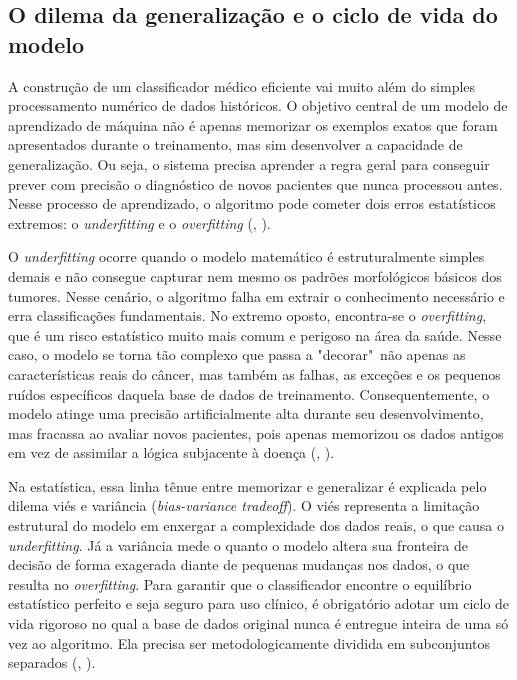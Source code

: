 \documentclass[
    12pt
    ,oneside
    ,a4paper
    ,chapter=TITLE
    ,section=TITLE
    ,sumario=abnt-6027-2012
    ,english,brazil]{abntex2} %
\begin{document}
\subsection{O dilema da generalização e o ciclo de vida do modelo}

A construção de um classificador médico eficiente vai muito além do simples processamento numérico de dados históricos. O objetivo central de um modelo de aprendizado de máquina não é apenas memorizar os exemplos exatos que foram apresentados durante o treinamento, mas sim desenvolver a capacidade de generalização. Ou seja, o sistema precisa aprender a regra geral para conseguir prever com precisão o diagnóstico de novos pacientes que nunca processou antes. Nesse processo de aprendizado, o algoritmo pode cometer dois erros estatísticos extremos: o \textit{underfitting} e o \textit{overfitting} (, \citeyear{Faceli2011}).

O \textit{underfitting} ocorre quando o modelo matemático é estruturalmente simples demais e não consegue capturar nem mesmo os padrões morfológicos básicos dos tumores. Nesse cenário, o algoritmo falha em extrair o conhecimento necessário e erra classificações fundamentais. No extremo oposto, encontra-se o \textit{overfitting}, que é um risco estatístico muito mais comum e perigoso na área da saúde. Nesse caso, o modelo se torna tão complexo que passa a "decorar"\ não apenas as características reais do câncer, mas também as falhas, as exceções e os pequenos ruídos específicos daquela base de dados de treinamento. Consequentemente, o modelo atinge uma precisão artificialmente alta durante seu desenvolvimento, mas fracassa ao avaliar novos pacientes, pois apenas memorizou os dados antigos em vez de assimilar a lógica subjacente à doença (, \citeyear{Faceli2011}).

Na estatística, essa linha tênue entre memorizar e generalizar é explicada pelo dilema viés e variância (\textit{bias-variance tradeoff}). O viés representa a limitação estrutural do modelo em enxergar a complexidade dos dados reais, o que causa o \textit{underfitting}. Já a variância mede o quanto o modelo altera sua fronteira de decisão de forma exagerada diante de pequenas mudanças nos dados, o que resulta no \textit{overfitting}. Para garantir que o classificador encontre o equilíbrio estatístico perfeito e seja seguro para uso clínico, é obrigatório adotar um ciclo de vida rigoroso no qual a base de dados original nunca é entregue inteira de uma só vez ao algoritmo. Ela precisa ser metodologicamente dividida em subconjuntos separados (, \citeyear{Bishop2006}).
\end{document}
